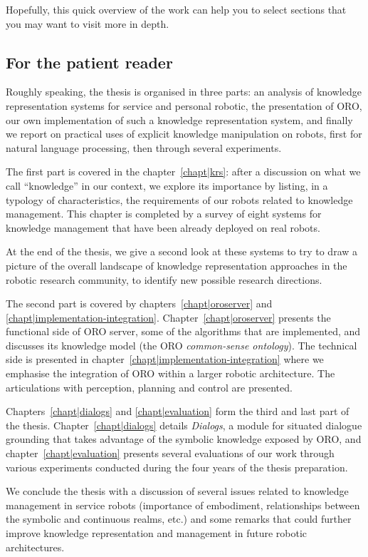 Hopefully, this quick overview of the work can help you to select sections that
you may want to visit more in depth.

\subsection*{For the patient reader}

Roughly speaking, the thesis is organised in three parts: an analysis of
knowledge representation systems for service and personal robotic, the
presentation of ORO, our own implementation of such a knowledge representation
system, and finally we report on practical uses of explicit knowledge
manipulation on robots, first for natural language processing, then through
several experiments.

The first part is covered in the chapter~\ref{chapt|krs}: after a discussion on
what we call ``knowledge'' in our context, we explore its importance by
listing, in a typology of characteristics, the requirements of our robots
related to knowledge management. This chapter is completed by a survey of
eight systems for knowledge management that have been already deployed on real
robots.

At the end of the thesis, we give a second look at these systems to try to
draw a picture of the overall landscape of knowledge representation approaches
in the robotic research community, to identify new possible research directions.

The second part is covered by chapters~\ref{chapt|oroserver} and
\ref{chapt|implementation-integration}. Chapter~\ref{chapt|oroserver} presents
the functional side of ORO server, some of the algorithms that are
implemented, and discusses its knowledge model (the ORO \emph{common-sense
ontology}). The technical side is presented in
chapter~\ref{chapt|implementation-integration} where we emphasise the
integration of ORO within a larger robotic architecture. The articulations with
perception, planning and control are presented.

Chapters~\ref{chapt|dialogs} and \ref{chapt|evaluation} form the third and last
part of the thesis. Chapter~\ref{chapt|dialogs} details \emph{Dialogs}, a
module for situated dialogue grounding that takes advantage of the symbolic
knowledge exposed by ORO, and chapter~\ref{chapt|evaluation} presents
several evaluations of our work through various experiments conducted during
the four years of the thesis preparation.

We conclude the thesis with a discussion of several issues related to knowledge
management in service robots (importance of embodiment, relationships between
the symbolic and continuous realms, etc.) and some remarks that could further
improve knowledge representation and management in future robotic
architectures.

